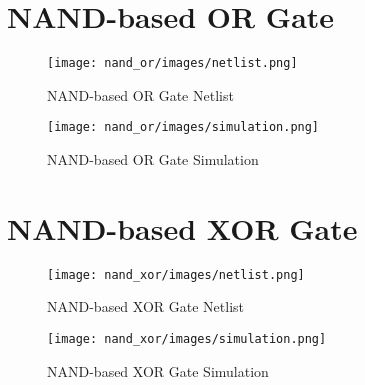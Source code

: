\documentclass[12pt,a4paper]{article}
\begin{document}
\newpage
\section*{NAND-based OR Gate}

\begin{figure}[H]
    \centering
    \texttt{[image: nand\_or/images/netlist.png]}
    \caption{NAND-based OR Gate Netlist}
\end{figure}

\begin{figure}[H]
    \centering
    \texttt{[image: nand\_or/images/simulation.png]}
    \caption{NAND-based OR Gate Simulation}
\end{figure}

\newpage
\section*{NAND-based XOR Gate}

\begin{figure}[H]
    \centering
    \texttt{[image: nand\_xor/images/netlist.png]}
    \caption{NAND-based XOR Gate Netlist}
\end{figure}

\begin{figure}[H]
    \centering
    \texttt{[image: nand\_xor/images/simulation.png]}
    \caption{NAND-based XOR Gate Simulation}
\end{figure}
\end{document}
